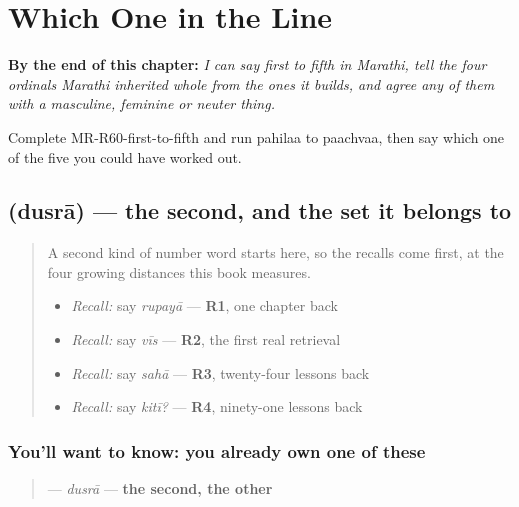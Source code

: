 
\chapter{Which One in the Line}
\label{ch:mr-ordinals}

\begin{chapteropening}
\textbf{By the end of this chapter:} \emph{I can say first to fifth in Marathi, tell the four ordinals Marathi inherited whole from the ones it builds, and agree any of them with a masculine, feminine or neuter thing.}

Complete MR-R60-first-to-fifth and run pahilaa to paachvaa, then say which one of the five you could have worked out.
\end{chapteropening}

\section[\texorpdfstring{\mr{दुसरा} (dusrā)}{दुसरा (dusrā)}]{ (dusrā) — the second, and the set it belongs to}

\label{lesson:MR-C60-dusra-ordinal}



\begin{quote}
A second kind of number word starts here, so the recalls come first, at the four growing distances this book measures.

\begin{itemize}
\raggedright
  \item \emph{Recall:} say \emph{rupayā} — \textbf{R1}, one chapter back
  \item \emph{Recall:} say \emph{vīs} — \textbf{R2}, the first real retrieval
  \item \emph{Recall:} say \emph{sahā} — \textbf{R3}, twenty-four lessons back
  \item \emph{Recall:} say \emph{kitī?} — \textbf{R4}, ninety-one lessons back
\end{itemize}
\end{quote}

\subsection*{You'll want to know: you already own one of these}
\begin{quote}
\textbf{} — \emph{dusrā} — \textbf{the second, the other}
\end{quote}

